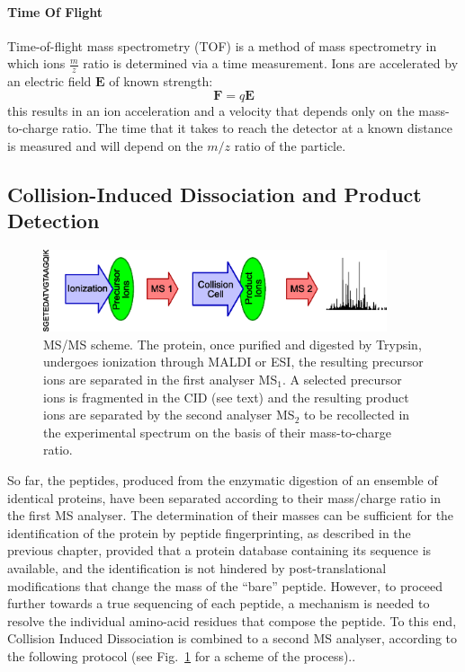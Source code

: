 \paragraph{Time Of Flight}
Time-of-flight mass spectrometry (TOF) is a method of mass spectrometry in
which ions $\frac mz$ ratio is determined via a time measurement. 
Ions are accelerated by an electric field $\mathbf{E}$ of known strength:
\begin{equation}
    \mathbf{F} = q \mathbf{E}
\end{equation}
this results in an ion acceleration and a velocity that depends only on 
the mass-to-charge ratio. 
The time that it takes to reach the detector at a known
distance is measured and will depend on the $m/z$ ratio of the
particle. 





\subsection{Collision-Induced Dissociation and Product Detection}
\label{subsec:cid-spectrum}

\begin{figure}
\centering
\includegraphics[width=0.9\textwidth]{./img/msms/msms-scheme.eps}
\caption{\label{fig:msms-scheme}
MS/MS scheme. The protein, once purified and digested by Trypsin, undergoes
ionization through MALDI or ESI, the resulting precursor ions are separated
in the first analyser MS$_1$. A selected precursor ions is fragmented in the CID
(see text) and the resulting product ions are separated by the second analyser
MS$_2$ to be recollected in the experimental spectrum on the basis of their
mass-to-charge ratio.}
\end{figure}


So far, the peptides, produced from the enzymatic digestion of an ensemble of
identical proteins, have been separated according to their mass/charge ratio in
the first MS analyser. The determination of their masses can be sufficient for
the identification of the protein by peptide fingerprinting, as described in the
previous chapter, provided that a protein database containing its sequence is
available, and the identification is not hindered by post-translational
modifications that change the mass of the ``bare'' peptide. However, to proceed
further towards a true sequencing of each peptide, a mechanism is needed to
resolve the individual amino-acid residues that compose the peptide. To this
end, Collision Induced Dissociation is combined to a second MS analyser,
according to the following protocol (see Fig.~\ref{fig:msms-scheme} for a scheme
of the process)..

